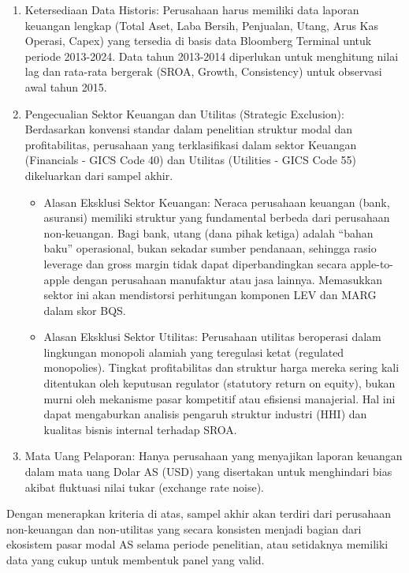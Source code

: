 \documentclass[12pt,a4paper]{report}
\providecommand{\tightlist}{%
  \setlength{\itemsep}{0pt}\setlength{\parskip}{0pt}%
}
\begin{document}
\begin{enumerate}
\def\labelenumi{\arabic{enumi}.}
\item
  Ketersediaan Data Historis: Perusahaan harus memiliki data laporan
  keuangan lengkap (Total Aset, Laba Bersih, Penjualan, Utang, Arus Kas
  Operasi, Capex) yang tersedia di basis data Bloomberg Terminal untuk
  periode 2013-2024. Data tahun 2013-2014 diperlukan untuk menghitung
  nilai lag dan rata-rata bergerak (SROA, Growth, Consistency) untuk
  observasi awal tahun 2015.
\item
  Pengecualian Sektor Keuangan dan Utilitas (Strategic Exclusion):
  Berdasarkan konvensi standar dalam penelitian struktur modal dan
  profitabilitas, perusahaan yang terklasifikasi dalam sektor Keuangan
  (Financials - GICS Code 40) dan Utilitas (Utilities - GICS Code 55)
  dikeluarkan dari sampel akhir.

  \begin{itemize}
  \tightlist
  \item
    Alasan Eksklusi Sektor Keuangan: Neraca perusahaan keuangan (bank,
    asuransi) memiliki struktur yang fundamental berbeda dari perusahaan
    non-keuangan. Bagi bank, utang (dana pihak ketiga) adalah ``bahan
    baku'' operasional, bukan sekadar sumber pendanaan, sehingga rasio
    leverage dan gross margin tidak dapat diperbandingkan secara
    apple-to-apple dengan perusahaan manufaktur atau jasa lainnya.
    Memasukkan sektor ini akan mendistorsi perhitungan komponen LEV dan
    MARG dalam skor BQS.
  \item
    Alasan Eksklusi Sektor Utilitas: Perusahaan utilitas beroperasi
    dalam lingkungan monopoli alamiah yang teregulasi ketat (regulated
    monopolies). Tingkat profitabilitas dan struktur harga mereka sering
    kali ditentukan oleh keputusan regulator (statutory return on
    equity), bukan murni oleh mekanisme pasar kompetitif atau efisiensi
    manajerial. Hal ini dapat mengaburkan analisis pengaruh struktur
    industri (HHI) dan kualitas bisnis internal terhadap SROA.
  \end{itemize}
\item
  Mata Uang Pelaporan: Hanya perusahaan yang menyajikan laporan keuangan
  dalam mata uang Dolar AS (USD) yang disertakan untuk menghindari bias
  akibat fluktuasi nilai tukar (exchange rate noise).
\end{enumerate}

Dengan menerapkan kriteria di atas, sampel akhir akan terdiri dari
perusahaan non-keuangan dan non-utilitas yang secara konsisten menjadi
bagian dari ekosistem pasar modal AS selama periode penelitian, atau
setidaknya memiliki data yang cukup untuk membentuk panel yang valid.
\end{document}
